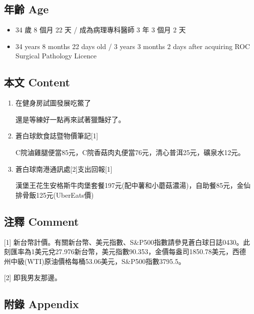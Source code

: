 \documentclass[a5paper, 11pt
]{book}
\providecommand{\tightlist}{%
  \setlength{\itemsep}{0pt}\setlength{\parskip}{0pt}}
\begin{document}
\hypertarget{ux5e74ux9f61-age-44}{%
\subsection{年齡 Age}\label{ux5e74ux9f61-age-44}}

\begin{itemize}
\tightlist
\item
  34 歲 8 個月 22 天 / 成為病理專科醫師 3 年 3 個月 2 天
\item
  34 years 8 months 22 days old / 3 years 3 months 2 days after
  acquiring ROC Surgical Pathology Licence
\end{itemize}

\hypertarget{ux672cux6587-content-44}{%
\subsection{本文 Content}\label{ux672cux6587-content-44}}

\begin{enumerate}
\def\labelenumi{\arabic{enumi}.}
\item
  在健身房試圖發展吃鱉了

  還是等練好一點再來試著獵豔好了。
\item
  蒼白球飲食誌暨物價筆記{[}1{]}

  C院滷雞腿便當85元，C院香菇肉丸便當76元，清心普洱25元，礦泉水12元。
\item
  蒼白球南港通訊處{[}2{]}支出回報{[}1{]}

  漢堡王花生安格斯牛肉堡套餐197元(配中薯和小蘑菇濃湯)，自助餐85元，金仙排骨飯125元(UberEats價)
\end{enumerate}

\hypertarget{ux6ce8ux91cb-comment-44}{%
\subsection{注釋 Comment}\label{ux6ce8ux91cb-comment-44}}

{[}1{]}
新台幣計價。有關新台幣、美元指數、S\&P500指數請參見蒼白球日誌0430。此刻匯率為1美元兌27.976新台幣，美元指數90.353，金價每盎司1850.78美元，西德州中級(WTI)原油價格每桶53.06美元，S\&P500指數3795.5。

{[}2{]} 即我男友那邊。

\hypertarget{ux9644ux9304-appendix-44}{%
\subsection{附錄 Appendix}\label{ux9644ux9304-appendix-44}}
\end{document}
